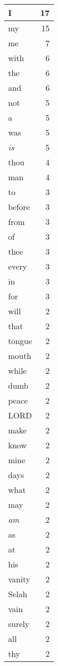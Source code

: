 \begin{center}
\begin{longtable}{l|r}
\hline \hline
\endlastfoot
I & 17 \\ \hline
my & 15 \\ \hline
me & 7 \\ \hline
with & 6 \\ \hline
the & 6 \\ \hline
and & 6 \\ \hline
not & 5 \\ \hline
a & 5 \\ \hline
was & 5 \\ \hline
\emph{is} & 5 \\ \hline
thou & 4 \\ \hline
man & 4 \\ \hline
to & 3 \\ \hline
before & 3 \\ \hline
from & 3 \\ \hline
of & 3 \\ \hline
thee & 3 \\ \hline
every & 3 \\ \hline
in & 3 \\ \hline
for & 3 \\ \hline
will & 2 \\ \hline
that & 2 \\ \hline
tongue & 2 \\ \hline
mouth & 2 \\ \hline
while & 2 \\ \hline
dumb & 2 \\ \hline
peace & 2 \\ \hline
LORD & 2 \\ \hline
make & 2 \\ \hline
know & 2 \\ \hline
mine & 2 \\ \hline
days & 2 \\ \hline
what & 2 \\ \hline
may & 2 \\ \hline
\emph{am} & 2 \\ \hline
as & 2 \\ \hline
at & 2 \\ \hline
his & 2 \\ \hline
vanity & 2 \\ \hline
Selah & 2 \\ \hline
vain & 2 \\ \hline
surely & 2 \\ \hline
all & 2 \\ \hline
thy & 2 \\ \hline

\end{longtable}
\end{center}
